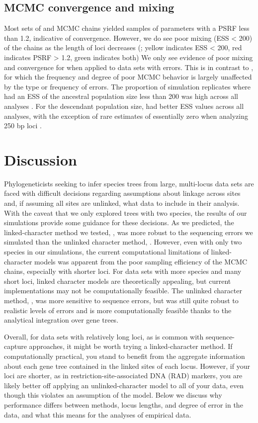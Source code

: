\subsection{MCMC convergence and mixing}
Most sets of \beast and \ecoevolity MCMC chains yielded samples of parameters with
a PSRF less than 1.2, indicative of convergence.
However, we do see poor mixing (ESS < 200) of the \beast chains as the length
of loci decreases (\mainfigs;
yellow indicates ESS < 200, red indicates PSRF > 1.2, green indicates both)
We only see evidence of poor mixing and convergence for \ecoevolity when
applied to data sets with errors.
This is in contrast to \beast, for which the frequency and degree of poor MCMC
behavior is largely unaffected by the type or frequency of errors.
The proportion of simulation replicates where \beast had an ESS of the
ancestral population size less than 200 was high across all analyses
\rootfigsp.
For the descendant population size, \beast had better ESS values across all
analyses, with the exception of rare estimates of essentially zero when
analyzing 250 bp loci \thetafigsp.


\section{Discussion}

Phylogeneticists seeking to infer species trees from large, multi-locus data
sets are faced with difficult decisions regarding assumptions about linkage
across sites and, if assuming all sites are unlinked, what data to include in
their analysis.
With the caveat that we only explored trees with two species,
the results of our simulations provide some guidance for these decisions. 
As we predicted, the linked-character method we tested, \beast, was more robust
to the sequencing errors we simulated than the unlinked character method,
\ecoevolity.
However, even with only two species in our simulations, the current
computational limitations of linked-character models was apparent from the poor
sampling efficiency of the MCMC chains, especially with shorter loci.
For data sets with more species and many short loci, linked character models
are theoretically appealing, but current implementations may not be
computationally feasible.
The unlinked character method, \ecoevolity, was more sensitive to sequence
errors, but was still quite robust to realistic levels of errors and is more
computationally feasible thanks to the analytical integration over gene trees.

Overall, for data sets with relatively long loci, as is common with
sequence-capture approaches, it might be worth trying a linked-character
method.
If computationally practical, you stand to benefit from the aggregate
information about each gene tree contained in the linked sites of each locus.
However, if your loci are shorter, as in restriction-site-associated DNA (RAD)
markers, you are likely better off applying an unlinked-character model to all
of your data, even though this violates an assumption of the model.
Below we discuss why performance differs between methods, locus lengths, and
degree of error in the data, and what this means for the analyses of empirical
data. 

